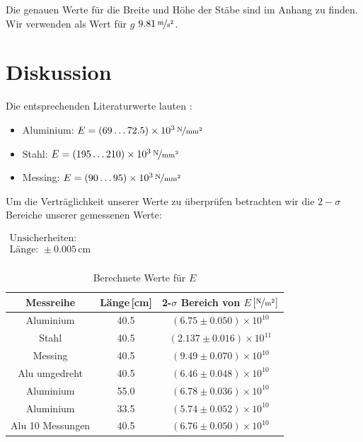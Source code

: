 \documentclass[11pt,a4paper]{article}
\begin{document}
Die genauen Werte f\"ur die Breite und H\"ohe der St\"abe sind im Anhang zu finden. Wir verwenden als Wert f\"ur $g$ $9.81\,\nicefrac{\mathrm{m}}{\mathrm{s}^2}$.

\pagebreak

\section{Diskussion}

Die entsprechenden Literaturwerte lauten \cite{Anleitung}:

\begin{itemize}
\item Aluminium: $E=(69\ldots72.5)\times10^3\,\nicefrac{\mathrm{N}}{\mathrm{mm^2}}$
\item Stahl: $E=(195\ldots210)\times10^3\,\nicefrac{\mathrm{N}}{\mathrm{mm^2}}$
\item Messing: $E=(90\ldots95)\times10^3\,\nicefrac{\mathrm{N}}{\mathrm{mm^2}}$
\end{itemize}

Um die Vertr\"aglichkeit unserer Werte zu \"uberpr\"ufen betrachten wir die $2-\sigma$ Bereiche unserer gemessenen Werte:

\begin{table}[h]
\centering
\caption{Berechnete Werte f\"ur $E$} \vspace{11pt}
$\begin{array}{l}
\textrm{Unsicherheiten:}\\
\textrm{L\"ange: } \pm 0.005\,\textrm{cm}\\
\end{array}$
\begin{tabular}{ccc}
\toprule
\textrm{Messreihe} & \textrm{L\"ange}\,[\textrm{cm}] & \textrm{2-}$\sigma$\textrm{ Bereich von }$E$\,$\left[\nicefrac{\mathrm{N}}{\mathrm{m^2}}\right]$ \\
\midrule 
\textrm{Aluminium} & 40.5 & $(6.75\pm0.050)\times10^{10}$ \\
\textrm{Stahl} & 40.5 & $(2.137\pm0.016)\times10^{11}$ \\
\textrm{Messing} & 40.5 & $(9.49\pm0.070)\times10^{10}$ \\
\hline
\textrm{Alu umgedreht} & 40.5 & $(6.46\pm0.048)\times10^{10}$ \\
\textrm{Aluminium} & 55.0 & $(6.78\pm0.036)\times10^{10}$ \\ 
\textrm{Aluminium} & 33.5 & $(5.74\pm0.052)\times10^{10}$ \\ 
\textrm{Alu 10 Messungen} & 40.5 & $(6.76\pm0.050)\times10^{10}$ \\ 
\bottomrule
\end{tabular}
\label{Tab:1}
\end{table}
\end{document}
